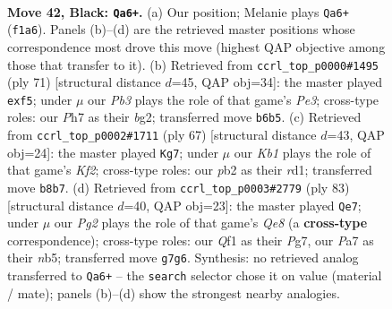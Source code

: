 \documentclass[11pt]{article}
\begin{document}
\clearpage

\begin{figure}[p]\centering
\begin{subfigure}{0.46\textwidth}\centering
\resizebox{\linewidth}{!}{%
\newchessgame
\chessboard[
  setfen={1k6/p1p2npp/1p2Q3/2p3P1/8/2P5/KP6/5q2 b - - 0 42},
  showmover=false,
  pgfstyle=straightmove, color=movearrow, markmove={f1-a6}
]}
\caption{}
\end{subfigure}\hfill
\begin{subfigure}{0.46\textwidth}\centering
\resizebox{\linewidth}{!}{%
\newchessgame
\chessboard[
  setfen={8/3Qnp2/1p2p2p/4PPpk/1q6/6P1/6BK/8 b - - 0 36},
  showmover=false,
  pgfstyle=straightmove, color=movearrow, markmove={e6-f5}
]}
\caption{}
\end{subfigure}
\\[4pt]
\begin{subfigure}{0.46\textwidth}\centering
\resizebox{\linewidth}{!}{%
\newchessgame
\chessboard[
  setfen={5q2/1p3k1p/p4np1/6Q1/4p3/P7/1PP5/1K1R4 b - - 5 34},
  showmover=false,
  pgfstyle=straightmove, color=movearrow, markmove={f7-g7}
]}
\caption{}
\end{subfigure}\hfill
\begin{subfigure}{0.46\textwidth}\centering
\resizebox{\linewidth}{!}{%
\newchessgame
\chessboard[
  setfen={8/1k4p1/1p3n1p/pN1p4/5QP1/P7/KPP5/4q3 b - - 7 42},
  showmover=false,
  pgfstyle=straightmove, color=movearrow, markmove={e1-e7}
]}
\caption{}
\end{subfigure}
\caption{\textbf{Move 42, Black: \texttt{Qa6+}.} (a) Our position; Melanie plays \texttt{Qa6+} (\texttt{f1a6}). Panels (b)--(d) are the retrieved master positions whose correspondence most drove this move (highest QAP objective among those that transfer to it). (b) Retrieved from \texttt{ccrl\_top\_p0000\#1495} (ply 71) [structural distance $d$=45, QAP obj=34]: the master played \texttt{exf5}; under $\mu$ our \emph{Pb3} plays the role of that game's \emph{Pe3}; cross-type roles: our \emph{P}h7 as their \emph{b}g2; transferred move \texttt{b6b5}. (c) Retrieved from \texttt{ccrl\_top\_p0002\#1711} (ply 67) [structural distance $d$=43, QAP obj=24]: the master played \texttt{Kg7}; under $\mu$ our \emph{Kb1} plays the role of that game's \emph{Kf2}; cross-type roles: our \emph{p}b2 as their \emph{r}d1; transferred move \texttt{b8b7}. (d) Retrieved from \texttt{ccrl\_top\_p0003\#2779} (ply 83) [structural distance $d$=40, QAP obj=23]: the master played \texttt{Qe7}; under $\mu$ our \emph{Pg2} plays the role of that game's \emph{Qe8} (a \textbf{cross-type} correspondence); cross-type roles: our \emph{Q}f1 as their \emph{P}g7, our \emph{P}a7 as their \emph{n}b5; transferred move \texttt{g7g6}. Synthesis: no retrieved analog transferred to \texttt{Qa6+} -- the \texttt{search} selector chose it on value (material / mate); panels (b)--(d) show the strongest nearby analogies.}
\label{fig:thought-m83}
\end{figure}
\end{document}
